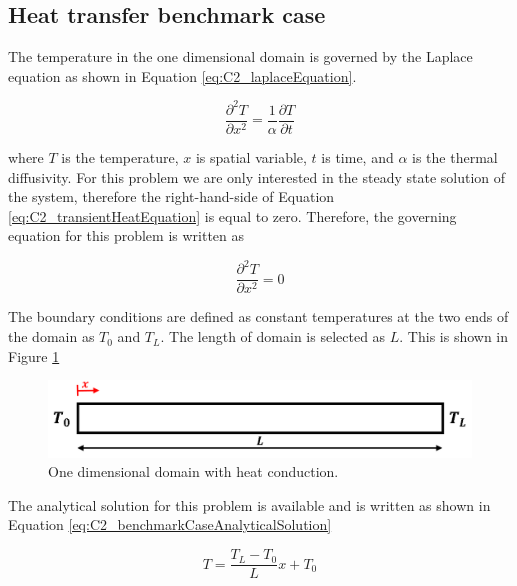 \subsection{Heat transfer benchmark case}
The temperature in the one dimensional domain is governed by the Laplace equation as shown in Equation \eqref{eq:C2_laplaceEquation}.

\begin{equation}\label{eq:C2_transientHeatEquation}
	\frac{\partial^2 T}{\partial x^2} = \frac{1}{\alpha} \frac{\partial T}{\partial t}
\end{equation}

where $T$ is the temperature, $x$ is spatial variable, $t$ is time, and $\alpha$ is the thermal diffusivity. For this problem we are only interested in the steady state solution of the system, therefore the right-hand-side of Equation \eqref{eq:C2_transientHeatEquation} is equal to zero. Therefore, the governing equation for this problem is written as

\begin{equation}\label{eq:C2_laplaceEquation}
	\frac{\partial^2 T}{\partial x^2} = 0
\end{equation}

The boundary conditions are defined as constant temperatures at the two ends of the domain as $T_0$ and $T_L$. The length of domain is selected as $L$. This is shown in Figure \ref{fig:C2_benchmarkCase}

\begin{figure}[h]
	\centering
	\includegraphics[width=14.00cm]{Chapter_2/figure/benchmark_case.png}
	\caption{One dimensional domain with heat conduction.}
	\label{fig:C2_benchmarkCase}
\end{figure}

The analytical solution for this problem is available and is written as shown in Equation \eqref{eq:C2_benchmarkCaseAnalyticalSolution}

\begin{equation}\label{eq:C2_benchmarkCaseAnalyticalSolution}
	T = \frac{T_L - T_0}{L} x + T_0
\end{equation}

